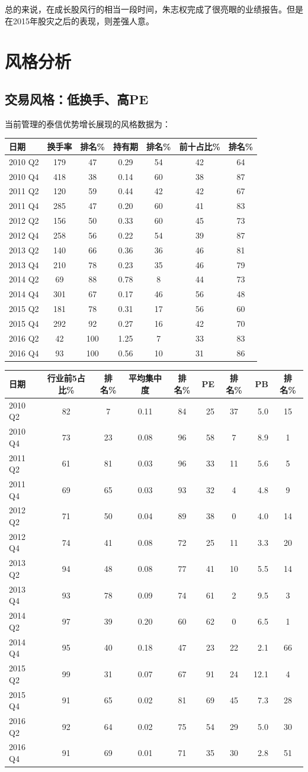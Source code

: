\documentclass[hyperref,]{ctexart}
\begin{document}
总的来说，在成长股风行的相当一段时间，朱志权完成了很亮眼的业绩报告。但是在2015年股灾之后的表现，则差强人意。

\section{风格分析}

\subsection{交易风格：低换手、高PE}\label{pe}

当前管理的泰信优势增长展现的风格数据为：

\begin{longtable}[]{@{}lcccccc@{}}
\toprule
日期 & 换手率 & 排名\% & 持有期 & 排名\% & 前十占比\% &
排名\%\tabularnewline
\midrule
\endhead
2010 Q2 & 179 & 47 & 0.29 & 54 & 42 & 64\tabularnewline
2010 Q4 & 418 & 38 & 0.14 & 60 & 38 & 87\tabularnewline
2011 Q2 & 120 & 59 & 0.44 & 42 & 42 & 67\tabularnewline
2011 Q4 & 285 & 47 & 0.20 & 60 & 41 & 83\tabularnewline
2012 Q2 & 156 & 50 & 0.33 & 60 & 45 & 73\tabularnewline
2012 Q4 & 258 & 56 & 0.22 & 54 & 39 & 87\tabularnewline
2013 Q2 & 140 & 66 & 0.36 & 36 & 46 & 81\tabularnewline
2013 Q4 & 210 & 78 & 0.23 & 35 & 46 & 79\tabularnewline
2014 Q2 & 69 & 88 & 0.78 & 8 & 44 & 73\tabularnewline
2014 Q4 & 301 & 67 & 0.17 & 46 & 56 & 48\tabularnewline
2015 Q2 & 181 & 78 & 0.31 & 17 & 56 & 60\tabularnewline
2015 Q4 & 292 & 92 & 0.27 & 16 & 42 & 70\tabularnewline
2016 Q2 & 42 & 100 & 1.25 & 7 & 33 & 83\tabularnewline
2016 Q4 & 93 & 100 & 0.56 & 10 & 31 & 86\tabularnewline
\bottomrule
\end{longtable}

\begin{longtable}[]{@{}lccccrcrc@{}}
\toprule
日期 & 行业前5占比\% & 排名\% & 平均集中度 & 排名\% & PE & 排名\% & PB &
排名\%\tabularnewline
\midrule
\endhead
2010 Q2 & 82 & 7 & 0.11 & 84 & 25 & 37 & 5.0 & 15\tabularnewline
2010 Q4 & 73 & 23 & 0.08 & 96 & 58 & 7 & 8.9 & 1\tabularnewline
2011 Q2 & 61 & 81 & 0.03 & 96 & 33 & 11 & 5.6 & 5\tabularnewline
2011 Q4 & 69 & 65 & 0.03 & 93 & 32 & 4 & 4.8 & 9\tabularnewline
2012 Q2 & 71 & 50 & 0.04 & 89 & 38 & 0 & 4.0 & 14\tabularnewline
2012 Q4 & 74 & 41 & 0.08 & 72 & 25 & 11 & 3.3 & 20\tabularnewline
2013 Q2 & 94 & 48 & 0.08 & 77 & 41 & 10 & 5.5 & 14\tabularnewline
2013 Q4 & 93 & 78 & 0.09 & 74 & 61 & 2 & 9.5 & 3\tabularnewline
2014 Q2 & 97 & 39 & 0.20 & 60 & 62 & 0 & 6.5 & 1\tabularnewline
2014 Q4 & 95 & 40 & 0.18 & 47 & 23 & 22 & 2.1 & 66\tabularnewline
2015 Q2 & 99 & 31 & 0.07 & 67 & 91 & 24 & 12.1 & 4\tabularnewline
2015 Q4 & 91 & 65 & 0.02 & 81 & 69 & 45 & 7.3 & 28\tabularnewline
2016 Q2 & 92 & 64 & 0.02 & 75 & 54 & 29 & 5.0 & 30\tabularnewline
2016 Q4 & 91 & 69 & 0.01 & 71 & 35 & 30 & 2.8 & 51\tabularnewline
\bottomrule
\end{longtable}
\end{document}
